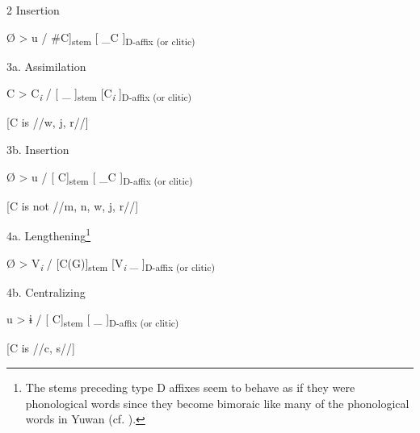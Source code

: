   2  Insertion

    Ø  >  u  /  \#C]\textsubscript{stem}  [ \_C  ]\textsubscript{D-affix (or clitic)}

  3a.  Assimilation

    C  >  C\textit{\textsubscript{i}}  /  [    \_ ]\textsubscript{stem}  [C\textit{\textsubscript{i}}  ]\textsubscript{D-affix (or clitic)}

    [C is //w, j, r//]      

  3b.  Insertion

    Ø  >  u  /  [     C]\textsubscript{stem}  [ \_C  ]\textsubscript{D-affix (or clitic)}

        [C is not //m, n, w, j, r//]  

  4a.  Lengthening\footnote{The stems preceding type D affixes seem to behave as if they were phonological words since they become bimoraic like many of the phonological words in Yuwan (cf. ).}

    Ø  >  V\textit{\textsubscript{i}}  /  [C(G)]\textsubscript{stem}  [V\textit{\textsubscript{i}} \_   ]\textsubscript{D-affix (or clitic)}

  4b.  Centralizing

    u  >  ɨ  /  [    C]\textsubscript{stem}  [ \_  ]\textsubscript{D-affix (or clitic)}

            [C is //c, s//]    
\z

